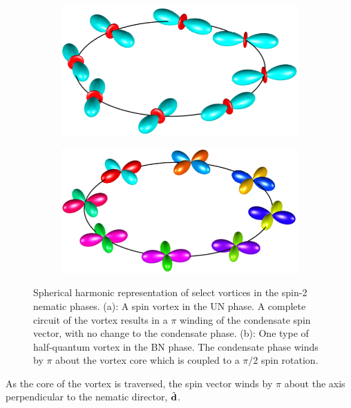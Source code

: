 \begin{figure}
    \centering
    \begin{subfigure}{0.49\textwidth}
        \includegraphics[width=\textwidth]
        {gfx/ch-groundStateSymmetries/UN-spin-vortex.pdf}
        \caption{\label{subfig: UN-spin-vortex}}
    \end{subfigure}
    \begin{subfigure}{0.49\textwidth}
        \includegraphics[width=\textwidth]
        {gfx/ch-groundStateSymmetries/BN-HQV.pdf}
        \caption{\label{subfig: BN-HQV}}
    \end{subfigure}
    \caption{Spherical harmonic representation of select vortices in the spin-2
        nematic phases.
        (a): A spin vortex in the UN phase. A complete circuit of the vortex
        results in a \(\pi \) winding of the condensate spin vector, with no change
        to the condensate phase.
        (b): One type of half-quantum vortex in the BN phase.
        The condensate phase winds by \(\pi \) about the vortex core which is
        coupled to a \(\pi / 2\) spin rotation.}
\end{figure}
As the core of the vortex is traversed, the spin vector winds by \(\pi \) about
the axis perpendicular to the nematic director, \(\hat{\vb{d}}\).

